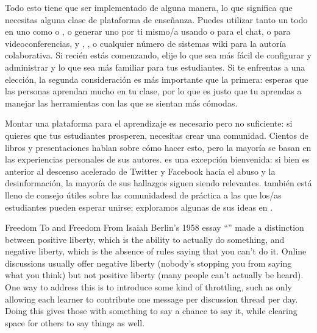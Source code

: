 Todo esto tiene que ser implementado de alguna manera,
lo que significa que necesitas alguna clase de plataforma de enseñanza.
Puedes utilizar tanto un  todo en uno
como  o ,
o generar uno por ti mismo/a 
usando  o  para el chat,
o  para videoconferencias,
y ,
,
o cualquier número de sistemas wiki para la autoría colaborativa.
Si recién estás comenzando,
elije lo que sea más fácil de configurar y administrar
y lo que sea más familiar para tus estudiantes.
Si te enfrentas a una elección,
la segunda consideración es más importante que la primera:
esperas que las personas aprendan mucho en tu clase,
por lo que es justo que tu aprendas a manejar las herramientas con las que se sientan más cómodas.

Montar una plataforma para el aprendizaje es necesario pero no suficiente:
si quieres que tus estudiantes prosperen,
necesitas crear una comunidad.
Cientos de libros y presentaciones hablan sobre cómo hacer esto,
pero la mayoría se basan en las experiencias personales de sus autores.
\cite{Krau2016} es una excepción bienvenida:
si bien es anterior al descenso acelerado de Twitter y Facebook hacia el abuso y la desinformación,
la mayoría de sus hallazgos siguen siendo relevantes.
\cite{Foge2005} también está lleno de consejo útiles
sobre las comunidadesd de práctica a las que los/as estudiantes pueden esperar unirse;
exploramos algunas de sus ideas en .

\begin{aside}{Freedom To and Freedom From}
  Isaiah Berlin's 1958 essay
  ``''
  made a distinction between positive liberty,
  which is the ability to actually do something,
  and negative liberty,
  which is the absence of rules saying that you can't do it.
  Online discussions usually offer negative liberty
  (nobody's stopping you from saying what you think)
  but not positive liberty
  (many people can't actually be heard).
  One way to address this is to introduce some kind of throttling,
  such as only allowing each learner to contribute one message per discussion thread per day.
  Doing this gives those with something to say a chance to say it,
  while clearing space for others to say things as well.
\end{aside}


